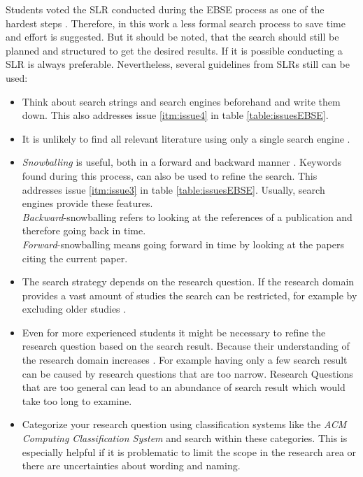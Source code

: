 Students voted the SLR conducted during the EBSE process as one of the hardest steps \cite{keele2007}. Therefore, in this work a less formal search process to save time and effort is suggested. But it should be noted, that the search should still be planned and structured to get the desired results. If it is possible conducting a SLR is always preferable.
\newline
\newline
Nevertheless, several guidelines from SLRs still can be used:
\begin{itemize}
\item Think about search strings and search engines beforehand and write them down. This also addresses issue \ref{itm:issue4} in table \ref{table:issuesEBSE}.

\item It is unlikely to find all relevant literature using only a single search engine \cite{Brereton2007}.

\item \emph{Snowballing} is useful, both in a forward and backward manner \cite{Wohlin2014}. Keywords found during this process, can also be used to refine the search. This addresses issue \ref{itm:issue3} in table \ref{table:issuesEBSE}. Usually, search engines provide these features.\\
\emph{Backward}-snowballing refers to looking at the references of a publication and therefore going back in time.\\
\emph{Forward}-snowballing means going forward in time by looking at the papers citing the current paper.

\item The search strategy depends on the research question. If the research domain provides a vast amount of studies the search can be restricted, for example by excluding older studies \cite{Brereton2007}.

\item Even for more experienced students it might be necessary to refine the research question based on the search result. Because their understanding of the research domain increases \cite{Brereton2007}. For example having only a few search result can be caused by research questions that are too narrow. Research Questions that are too general can lead to an abundance of search result which would take too long to examine.

\item Categorize your research question using classification systems like the \emph{ACM Computing Classification System} \cite{ACMCCS} and search within these categories. This is especially helpful if it is problematic to limit the scope in the research area or there are uncertainties about wording and naming.
\end{itemize} 

